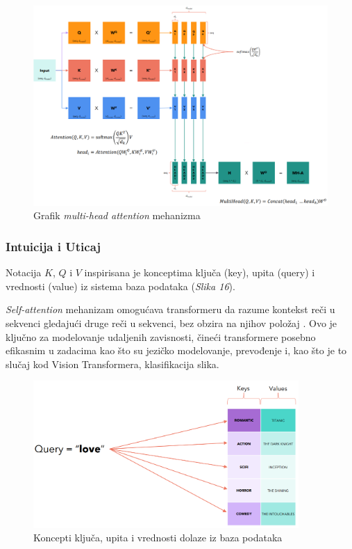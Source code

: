 \documentclass[12pt]{article}
\begin{document}
   \newpage
   \begin{figure}[h!]
      \hspace{-2cm} %
      \vspace{-0.5cm} %
      \includegraphics[width=1.3\textwidth]{mha.png}
      \caption{Grafik \textit{multi-head attention} mehanizma \cite{transformer}}
      \label{fig:mha}
   \end{figure}

   \subsubsection*{Intuicija i Uticaj}

   Notacija $K$, $Q$ i $V$ inspirisana je konceptima ključa (key), upita (query) i 
   vrednosti (value) iz sistema baza podataka (\textit{Slika 16}).

   \textit{Self-attention} mehanizam omogućava transformeru da razume kontekst reči u sekvenci 
   gledajući druge reči u sekvenci, bez obzira na njihov položaj \cite{trans_exp}. 
   Ovo je ključno za modelovanje udaljenih zavisnosti, čineći transformere posebno efikasnim u 
   zadacima kao što su jezičko modelovanje, prevođenje i, kao što je to slučaj kod 
   Vision Transformera, klasifikacija slika.

   \newpage
   \begin{figure}[h!]
      \centering
      \vspace{-1cm} %
      \includegraphics[width=0.9\textwidth]{dict.png}
      \caption{Koncepti ključa, upita i vrednosti dolaze iz baza podataka \cite{transformer}}
      \label{fig:trans_inspiration}
   \end{figure}
\end{document}
